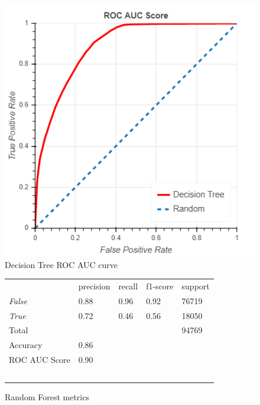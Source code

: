 \documentclass[10pt, conference, compsocconf]{IEEEtran}
\begin{document}
\begin{figure}
  \includegraphics[scale=0.45]{decision_tree_roc}
  \centering
  \caption{Decision Tree ROC AUC curve}
  \label{fig:decision_tree_roc}
\end{figure}


\begin{figure}
  \begin{tabular}{lllll}
                  & precision & recall      & f1-score  & support \\
  \textit{False}  & 0.88      & 0.96        & 0.92      & 76719 \\
  \textit{True}   & 0.72      & 0.46        & 0.56      & 18050 \\
  Total			      &           &             &           & 94769 \\
  Accuracy        & 0.86 \\
  ROC AUC Score	  & 0.90 \\\
  \end{tabular}
  \caption{Random Forest metrics}
  \label{fig:random_forest_metrics}
\end{figure}
\end{document}
